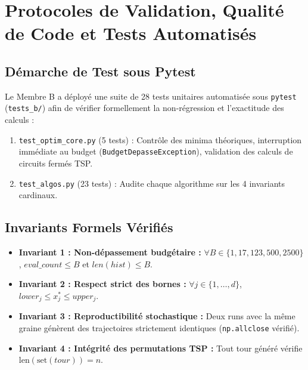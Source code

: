 \documentclass[11pt,a4paper]{article}
\begin{document}
\section{Protocoles de Validation, Qualité de Code et Tests Automatisés}

\subsection{Démarche de Test sous Pytest}
Le Membre B a déployé une suite de 28 tests unitaires automatisée sous \texttt{pytest} (\texttt{tests\_b/}) afin de vérifier formellement la non-régression et l'exactitude des calculs :
\begin{enumerate}\setlength{\itemsep}{0.1em}
    \item \texttt{test\_optim\_core.py} (5 tests) : Contrôle des minima théoriques, interruption immédiate au budget (\texttt{BudgetDepasseException}), validation des calculs de circuits fermés TSP.
    \item \texttt{test\_algos.py} (23 tests) : Audite chaque algorithme sur les 4 invariants cardinaux.
\end{enumerate}

\subsection{Invariants Formels Vérifiés}
\begin{itemize}\setlength{\itemsep}{0.1em}
    \item \textbf{Invariant 1 : Non-dépassement budgétaire :} $\forall B \in \{1, 17, 123, 500, 2500\}$, $eval\_count \le B$ et $len(hist) \le B$.
    \item \textbf{Invariant 2 : Respect strict des bornes :} $\forall j \in \{1, \dots, d\}$, $lower_j \le x_j^* \le upper_j$.
    \item \textbf{Invariant 3 : Reproductibilité stochastique :} Deux runs avec la même graine génèrent des trajectoires strictement identiques (\texttt{np.allclose} vérifié).
    \item \textbf{Invariant 4 : Intégrité des permutations TSP :} Tout tour généré vérifie $\text{len}(\text{set}(tour)) = n$.
\end{itemize}
\end{document}
